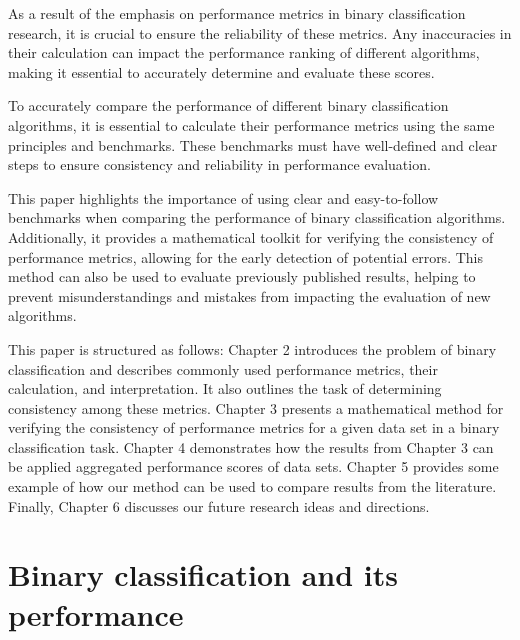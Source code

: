 \documentclass[3p,times]{elsarticle}
\begin{document}
As a result of the emphasis on performance metrics in binary classification research, it is crucial to ensure the reliability of these metrics. Any inaccuracies in their calculation can impact the performance ranking of different algorithms, making it essential to accurately determine and evaluate these scores.

To accurately compare the performance of different binary classification algorithms, it is essential to calculate their performance metrics using the same principles and benchmarks. These benchmarks must have well-defined and clear steps to ensure consistency and reliability in performance evaluation.

This paper highlights the importance of using clear and easy-to-follow benchmarks when comparing the performance of binary classification algorithms. Additionally, it provides a mathematical toolkit for verifying the consistency of performance metrics, allowing for the early detection of potential errors. This method can also be used to evaluate previously published results, helping to prevent misunderstandings and mistakes from impacting the evaluation of new algorithms.

This paper is structured as follows: Chapter 2 introduces the problem of binary classification and describes commonly used performance metrics, their calculation, and interpretation. It also outlines the task of determining consistency among these metrics. Chapter 3 presents a mathematical method for verifying the consistency of performance metrics for a given data set in a binary classification task. Chapter 4 demonstrates how the results from Chapter 3 can be applied aggregated performance scores of data sets. Chapter 5 provides some example of how our method can be used to compare results from the literature. Finally, Chapter 6 discusses our future research ideas and directions.

\section{Binary classification and its performance}\label{section:BinaryClassification}
\end{document}
